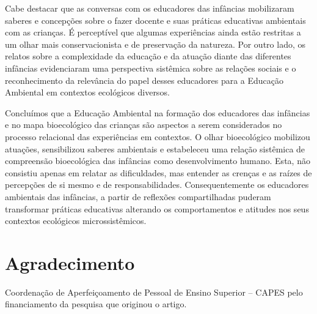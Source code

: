 \documentclass{textolivre-html}
\begin{document}
Cabe destacar que as conversas com os educadores das infâncias mobilizaram saberes e concepções sobre o fazer docente e suas práticas educativas ambientais com as crianças. É perceptível que algumas experiências ainda estão restritas a um olhar mais conservacionista e de preservação da natureza. Por outro lado, os relatos sobre a complexidade da educação e da atuação diante das diferentes infâncias evidenciaram uma perspectiva sistêmica sobre as relações sociais e o reconhecimento da relevância do papel desses educadores para a Educação Ambiental em contextos ecológicos diversos.

Concluímos que a Educação Ambiental na formação dos educadores das infâncias e no mapa bioecológico das crianças são aspectos a serem considerados no processo relacional das experiências em contextos. O olhar bioecológico mobilizou atuações, sensibilizou saberes ambientais e estabeleceu uma relação sistêmica de compreensão bioecológica das infâncias como desenvolvimento humano. Esta, não consistiu apenas em relatar as dificuldades, mas entender as crenças e as raízes de percepções de si mesmo e de responsabilidades. Consequentemente os educadores ambientais das infâncias, a partir de reflexões compartilhadas puderam transformar práticas educativas alterando os comportamentos e atitudes nos seus contextos ecológicos microssistêmicos. 


\section*{Agradecimento}
Coordenação de Aperfeiçoamento de Pessoal de Ensino Superior – CAPES pelo financiamento da pesquisa que originou o artigo.



\printbibliography
\end{document}
